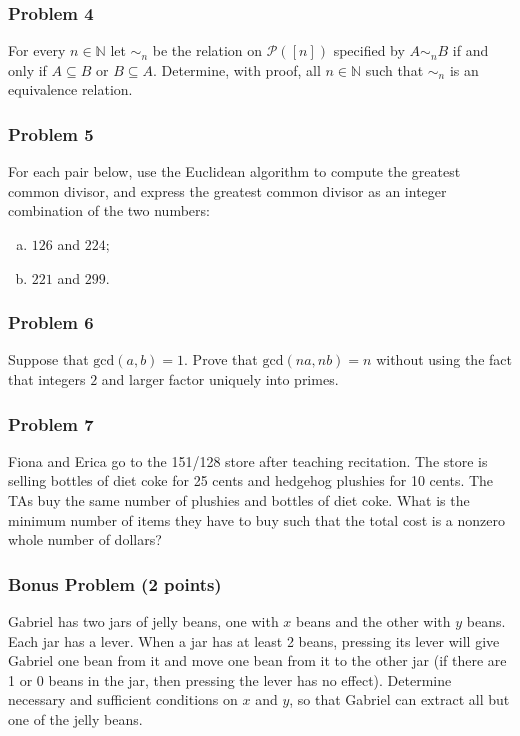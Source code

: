 \documentclass[11pt,onecolumn,fleqn]{article}
\theoremstyle{definition}
\begin{document}
\subsubsection*{Problem 4}
For every $n \in \mathbb{N}$ let $\sim_n$ be the relation on $\mathcal{P}([n])$ specified by $A \sim_n B$ if and only
if $A \subseteq B$ or $B \subseteq A$. Determine, with proof, all $n \in \mathbb{N}$ such that $\sim_n$ is an equivalence relation.


\subsubsection*{Problem 5}
For each pair below, use the Euclidean algorithm to compute the greatest common divisor, and express the greatest 
common divisor as an integer combination of the two numbers:
\begin{enumerate}[(a)]
\item $126$ and $224$;
\item $221$ and $299$.
\end{enumerate}

\subsubsection*{Problem 6}
Suppose that $\mathrm{gcd}(a,b)=1$. Prove that $\mathrm{gcd}(na,nb)=n$ without using the fact that
integers $2$ and larger factor uniquely into primes.

\subsubsection*{Problem 7}
Fiona and Erica go to the 151/128 store after teaching recitation. The store is selling bottles of diet coke for 25 cents and hedgehog plushies for 10 cents. The TAs buy the same number of plushies and bottles of diet coke. What is the minimum number of items they have to buy such that the total cost is a nonzero whole number of dollars?


\subsubsection*{Bonus Problem  (2 points)}
Gabriel has two jars of jelly beans, one with $x$ beans and the other with $y$ beans. Each jar has a lever.
When a jar has at least 2 beans, pressing its lever will give Gabriel one bean from it and move one bean from
it to the other jar (if there are 1 or 0 beans in the jar, then pressing the lever has no effect). Determine
necessary and sufficient conditions on $x$ and $y$, so that Gabriel can extract all but one of the jelly beans.
\end{document}
